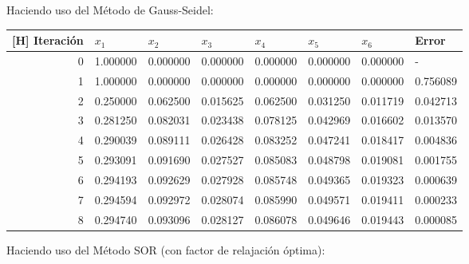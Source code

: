 Haciendo uso del Método de Gauss-Seidel:

\begin{table}[H]
    \centering
    \begin{tabular}{r|llllll|l}[H]
        Iteración & $x_1$ &    $x_2$  &     $x_3$  &     $x_4$  &     $x_5$  &     $x_6$  &     Error \\
        \hline
         0  &  1.000000  &  0.000000  &  0.000000  &  0.000000  &  0.000000  &  0.000000  &  -        \\
         1  &  1.000000  &  0.000000  &  0.000000  &  0.000000  &  0.000000  &  0.000000  &  0.756089 \\
         2  &  0.250000  &  0.062500  &  0.015625  &  0.062500  &  0.031250  &  0.011719  &  0.042713 \\
         3  &  0.281250  &  0.082031  &  0.023438  &  0.078125  &  0.042969  &  0.016602  &  0.013570 \\
         4  &  0.290039  &  0.089111  &  0.026428  &  0.083252  &  0.047241  &  0.018417  &  0.004836 \\
         5  &  0.293091  &  0.091690  &  0.027527  &  0.085083  &  0.048798  &  0.019081  &  0.001755 \\
         6  &  0.294193  &  0.092629  &  0.027928  &  0.085748  &  0.049365  &  0.019323  &  0.000639 \\
         7  &  0.294594  &  0.092972  &  0.028074  &  0.085990  &  0.049571  &  0.019411  &  0.000233 \\
         8  &  0.294740  &  0.093096  &  0.028127  &  0.086078  &  0.049646  &  0.019443  &  0.000085
    \end{tabular}
\end{table}

Haciendo uso del Método SOR (con factor de relajación óptima):

